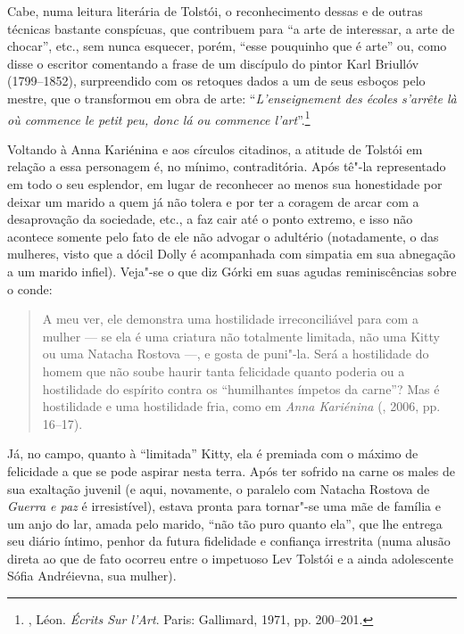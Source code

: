 Cabe, numa leitura literária de Tolstói, o reconhecimento dessas e de
outras técnicas bastante conspícuas, que contribuem para
``a arte de interessar, a arte de chocar'', etc., sem nunca esquecer,
porém, ``esse pouquinho que é arte'' ou, como disse o escritor
comentando a frase de um discípulo do pintor Karl
Briullóv (1799--1852), surpreendido com os retoques dados
a um de seus esboços pelo mestre, que o transformou em obra de arte:
``\emph{L'enseignement des écoles s'arrête là où commence \emph{le petit
peu}, donc lá ou commence l'art}''.\footnote{, Léon. \emph{Écrits Sur l'Art}. Paris: Gallimard, 1971, pp. 200--201.}

Voltando à Anna Kariénina e aos círculos citadinos, a atitude de
Tolstói em relação a essa personagem é, no mínimo, contraditória. Após
tê"-la representado em todo o seu esplendor, em lugar de reconhecer ao
menos sua honestidade por deixar um marido a quem já não tolera e
por ter a coragem de arcar com a desaprovação da sociedade, etc., a faz
cair até o ponto extremo, e isso não acontece somente pelo fato de ele
não advogar o adultério (notadamente, o das mulheres, visto que a dócil
Dolly é acompanhada com simpatia em sua abnegação a um marido infiel).
Veja"-se o que diz Górki em suas agudas reminiscências sobre o conde:

\begin{quotation}
A meu ver, ele demonstra uma hostilidade irreconciliável para com a
mulher --- se ela é uma criatura não totalmente limitada, não uma Kitty
ou uma Natacha Rostova ---, e gosta de puni"-la. Será a hostilidade do
homem que não soube haurir tanta felicidade quanto poderia ou a
hostilidade do espírito contra os ``humilhantes ímpetos da carne''? Mas é
hostilidade e uma hostilidade fria, como em \emph{Anna Kariénina} (, 2006, pp. 16--17).
\end{quotation}

Já, no campo, quanto à ``limitada'' Kitty, ela é premiada com o
máximo de felicidade a que se pode aspirar nesta terra.
Após ter sofrido na carne os males de sua exaltação juvenil (e aqui,
novamente, o paralelo com Natacha Rostova de \emph{Guerra e paz} é
irresistível), estava pronta para tornar"-se uma mãe de família e um anjo do lar,
amada pelo marido, ``não tão puro quanto ela'', que lhe entrega seu diário
íntimo, penhor da futura fidelidade e confiança irrestrita (numa alusão
direta ao que de fato ocorreu entre o impetuoso Lev Tolstói e a ainda
adolescente Sófia Andréievna, sua mulher).

